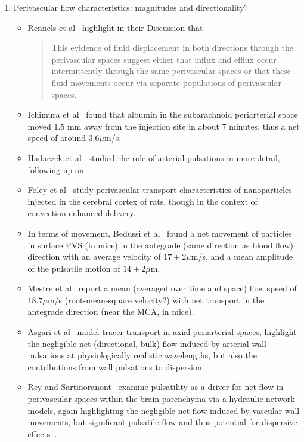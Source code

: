 \documentclass[fleqn,10pt]{wlscirep}
\begin{document}
\begin{enumerate}
\begin{itemize}
  \end{itemize}
\item
  Perivascular flow characteristics: magnitudes and directionality?
  \begin{itemize}
  \item
    Rennels et al~\cite{rennels1985evidence} highlight in their
    Discussion that
    \begin{quote}
      This evidence of fluid displacement in both directions through
      the perivascular spaces suggest either that influx and efflux
      occur intermittently through the same perivascular spaces or
      that these fluid movements occur via separate populations of
      perivascular spaces.
    \end{quote}
  \item
    Ichimura et al~\cite{ichimura1991distribution} found that albumin in the subarachnoid periarterial space moved 1.5 mm away from the injection site in about 7 minutes, thus a net speed of around $3.6 \mu$m/s. 
  \item
    Hadaczek et al~\cite{hadaczek2006perivascular} studied the role of arterial pulsations in more detail, following up on~\cite{rennels1985evidence}.
  \item Foley et al~\cite{foley2012realtime} study perivascular transport characteristics of nanoparticles injected in the cerebral cortex of rats, though in the context of convection-enhanced delivery.
  \item
    In terms of movement, Bedussi et al~\cite{bedussi2018paravascular} found a net movement of particles in surface PVS (in mice) in the antegrade (same direction as blood flow) direction with an average velocity of $17 \pm 2\mu$m/s, and a mean amplitude of the pulsatile motion of $14 \pm 2 \mu$m.
\item Mestre et al~\cite{mestre2018flow} report a mean (averaged over time and space) flow speed of $18.7 \mu$m/s (root-mean-square velocity?) with net transport in the antegrade direction (near the MCA, in mice).
\item
  Asgari et al~\cite{asgari2016glymphatic} model tracer transport in axial periarterial spaces, highlight the negligible net (directional, bulk) flow induced by arterial wall pulsations at physiologically realistic wavelengths, but also the contributions from wall pulsations to dispersion. 
\item
  Rey and Sartinoranont~\cite{rey2018pulsatile} examine pulsatility as a driver for net flow in perivascular spaces within the brain parenchyma via a hydraulic network models, again highlighting the negligible net flow induced by vascular wall movements, but significant pulsatile flow and thus potential for dispersive effects~\cite{watson1983diffusion, asgari2016glymphatic}.

\end{itemize}
\end{enumerate}
\end{document}
